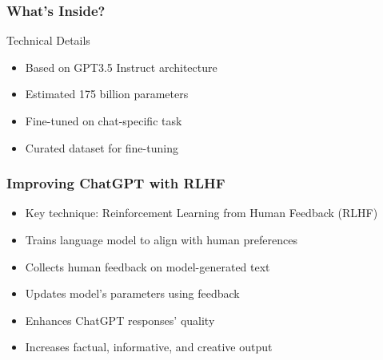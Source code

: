 \begin{frame}[fragile]\frametitle{What's Inside?}
Technical Details
    \begin{itemize}
        \item Based on GPT3.5 Instruct architecture
        \item Estimated 175 billion parameters
        \item Fine-tuned on chat-specific task
        \item Curated dataset for fine-tuning
    \end{itemize}
	

\end{frame}

\begin{frame}[fragile]\frametitle{Improving ChatGPT with RLHF}
    \begin{itemize}
        \item Key technique: Reinforcement Learning from Human Feedback (RLHF)
        \item Trains language model to align with human preferences
        \item Collects human feedback on model-generated text
        \item Updates model's parameters using feedback
        \item Enhances ChatGPT responses' quality
        \item Increases factual, informative, and creative output
    \end{itemize}
\end{frame}


